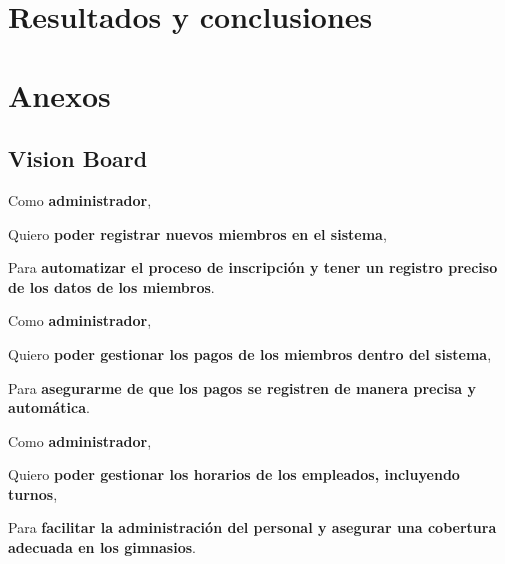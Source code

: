 \documentclass[spanish, 12pt]{article}
\begin{document}
	\section{Resultados y conclusiones}
	\label{resultados-y-conclusiones}
	\section{Anexos}
	\label{anexos}
	\subsection{Vision Board}
	\label{vision-board}
	\noindent
	\begin{minipage}{0.498\linewidth}
		\noindent
		\begin{PostItNote}
			[Width=0.9\linewidth,Corner=true,Pin=None,Color=html2,Rotate=-3 ,Title={ Registro de Miembros},FontTitle={\bfseries\itshape}
			] Como \textbf{administrador},

			Quiero \textbf{poder registrar nuevos miembros en el sistema},

			Para \textbf{automatizar el proceso de inscripción y tener un registro
			preciso de los datos de los miembros}.
		\end{PostItNote}
		\vspace{0.5cm}
	\end{minipage}
	\noindent
	\begin{minipage}{0.498\linewidth}
		\noindent
		\begin{PostItNote}
			[Width=0.9\linewidth,Corner=true,Pin=None,Color=html3,Rotate=2.2 ,Title={ Gestión de Pagos},FontTitle={\bfseries\itshape}
			] Como \textbf{administrador},

			Quiero \textbf{poder gestionar los pagos de los miembros dentro del
			sistema},

			Para \textbf{asegurarme de que los pagos se registren de manera precisa y
			automática}.
		\end{PostItNote}
		\vspace{0.5cm}
	\end{minipage}
	\noindent
	\begin{minipage}{0.498\linewidth}
		\noindent
		\begin{PostItNote}
			[Width=0.9\linewidth,Corner=true,Pin=None,Color=html4,Rotate=1.7 ,Title={ Gestión de Empleados y Horarios},FontTitle={\bfseries\itshape}
			] Como \textbf{administrador},

			Quiero \textbf{poder gestionar los horarios de los empleados, incluyendo turnos},

			Para \textbf{facilitar la administración del personal y asegurar una
			cobertura adecuada en los gimnasios}.
		\end{PostItNote}
		\vspace{0.5cm}
	\end{minipage}
\end{document}
